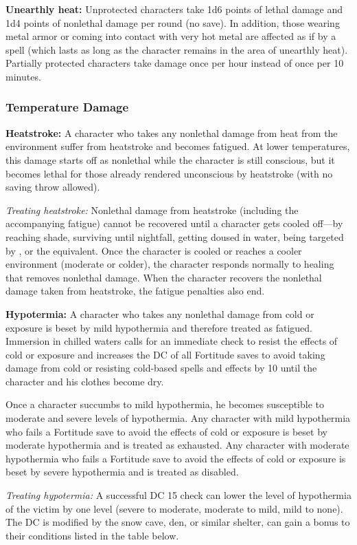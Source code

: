 \textbf{Unearthly heat:} Unprotected characters take 1d6 points of lethal damage and 1d4 points of nonlethal damage per round (no save). In addition, those wearing metal armor or coming into contact with very hot metal are affected as if by a  spell (which lasts as long as the character remains in the area of unearthly heat). Partially protected characters take damage once per hour instead of once per 10 minutes.

\subsubsection{Temperature Damage}
\textbf{Heatstroke:} A character who takes any nonlethal damage from heat from the environment suffer from heatstroke and becomes fatigued. At lower temperatures, this damage starts off as nonlethal while the character is still conscious, but it becomes lethal for those already rendered unconscious by heatstroke (with no saving throw allowed).

\textit{Treating heatstroke:} Nonlethal damage from heatstroke (including the accompanying fatigue) cannot be recovered until a character gets cooled off---by reaching shade, surviving until nightfall, getting doused in water, being targeted by , or the equivalent. Once the character is cooled or reaches a cooler environment (moderate or colder), the character responds normally to healing that removes nonlethal damage. When the character recovers the nonlethal damage taken from heatstroke, the fatigue penalties also end.

\textbf{Hypotermia:} A character who takes any nonlethal damage from cold or exposure is beset by mild hypothermia and therefore treated as fatigued. Immersion in chilled waters calls for an immediate check to resist the effects of cold or exposure and increases the DC of all Fortitude saves to avoid taking damage from cold or resisting cold-based spells and effects by 10 until the character and his clothes become dry.

Once a character succumbs to mild hypothermia, he becomes susceptible to moderate and severe levels of hypothermia. Any character with mild hypothermia who fails a Fortitude save to avoid the effects of cold or exposure is beset by moderate hypothermia and is treated as exhausted. Any character with moderate hypothermia who fails a Fortitude save to avoid the effects of cold or exposure is beset by severe hypothermia and is treated as disabled.

\textit{Treating hypotermia:} A successful DC 15  check can lower the level of hypothermia of the victim by one level (severe to moderate, moderate to mild, mild to none). The DC is modified by the snow cave, den, or similar shelter, can gain a bonus to their conditions listed in the table below.

